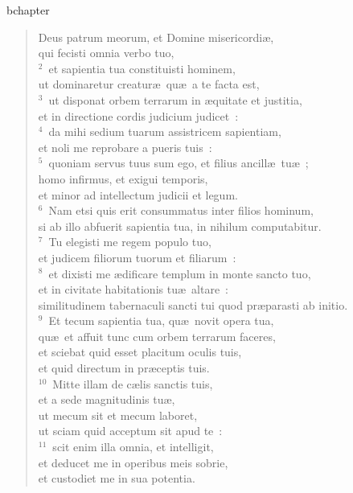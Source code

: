 bchapter\begin{verse}\vspace{-19pt}Deus patrum meorum, et Domine misericordi\ae ,\\ qui fecisti omnia verbo tuo,\\
${}^{2}$~et sapientia tua constituisti hominem,\\ ut dominaretur creatur\ae\ qu\ae\ a te facta est,\\
${}^{3}$~ut disponat orbem terrarum in \ae quitate et justitia,\\ et in directione cordis judicium judicet~:\\
${}^{4}$~da mihi sedium tuarum assistricem sapientiam,\\ et noli me reprobare a pueris tuis~:\\
${}^{5}$~quoniam servus tuus sum ego, et filius ancill\ae\ tu\ae~;\\ homo infirmus, et exigui temporis,\\ et minor ad intellectum judicii et legum.\\
${}^{6}$~Nam etsi quis erit consummatus inter filios hominum,\\ si ab illo abfuerit sapientia tua, in nihilum computabitur.\\
${}^{7}$~Tu elegisti me regem populo tuo,\\ et judicem filiorum tuorum et filiarum~:\\
${}^{8}$~et dixisti me \ae dificare templum in monte sancto tuo,\\ et in civitate habitationis tu\ae\ altare~:\\ similitudinem tabernaculi sancti tui quod pr\ae parasti ab initio.\\
${}^{9}$~Et tecum sapientia tua, qu\ae\ novit opera tua,\\ qu\ae\ et affuit tunc cum orbem terrarum faceres,\\ et sciebat quid esset placitum oculis tuis,\\ et quid directum in pr\ae ceptis tuis.\\
${}^{10}$~Mitte illam de c\ae lis sanctis tuis,\\ et a sede magnitudinis tu\ae ,\\ ut mecum sit et mecum laboret,\\ ut sciam quid acceptum sit apud te~:\\
${}^{11}$~scit enim illa omnia, et intelligit,\\ et deducet me in operibus meis sobrie,\\ et custodiet me in sua potentia.\\

\end{verse}
